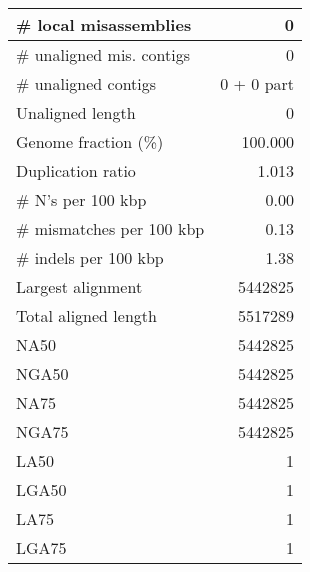 \documentclass[12pt,a4paper]{article}
\begin{document}
\begin{table}[ht]
\begin{center}
\begin{tabular}{|l*{1}{|r}|}
\# local misassemblies & 0 \\ \hline
\# unaligned mis. contigs & 0 \\ \hline
\# unaligned contigs & 0 + 0 part \\ \hline
Unaligned length & 0 \\ \hline
Genome fraction (\%) & 100.000 \\ \hline
Duplication ratio & 1.013 \\ \hline
\# N's per 100 kbp & 0.00 \\ \hline
\# mismatches per 100 kbp & 0.13 \\ \hline
\# indels per 100 kbp & 1.38 \\ \hline
Largest alignment & 5442825 \\ \hline
Total aligned length & 5517289 \\ \hline
NA50 & 5442825 \\ \hline
NGA50 & 5442825 \\ \hline
NA75 & 5442825 \\ \hline
NGA75 & 5442825 \\ \hline
LA50 & 1 \\ \hline
LGA50 & 1 \\ \hline
LA75 & 1 \\ \hline
LGA75 & 1 \\ \hline
\end{tabular}
\end{center}
\end{table}
\end{document}
